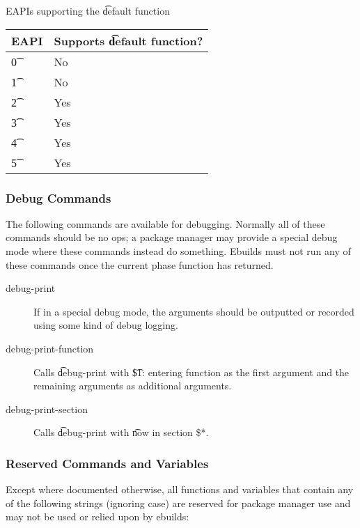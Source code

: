 \begin{centertable}{EAPIs supporting the \t{default} function} \label{tab:default-function-table}
    \begin{tabular}{ l l }
        \toprule
            \multicolumn{1}{c}{\textbf{EAPI}} &
            \multicolumn{1}{c}{\textbf{Supports \t{default} function?}} \\
            \midrule
    \t{0} & No \\
    \t{1} & No \\
    \t{2} & Yes \\
    \t{3} & Yes \\
    \t{4} & Yes \\
    \t{5} & Yes \\
    \bottomrule
    \end{tabular}
\end{centertable}

\subsubsection{Debug Commands}
The following commands are available for debugging. Normally all of these commands should be no ops;
a package manager may provide a special debug mode where these commands instead do something.
Ebuilds must not run any of these commands once the current phase function has returned.

\begin{description}
\item[debug-print] If in a special debug mode, the arguments should be outputted or recorded using
    some kind of debug logging.
\item[debug-print-function] Calls \t{debug-print} with \t{\$1: entering function} as the first
    argument and the remaining arguments as additional arguments.
\item[debug-print-section] Calls \t{debug-print} with \t{now in section \$*}.
\end{description}

\subsubsection{Reserved Commands and Variables}

Except where documented otherwise, all functions and variables that contain any of the following
strings (ignoring case) are reserved for package manager use and may not be used or relied upon by
ebuilds:

